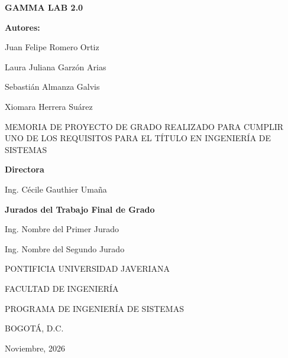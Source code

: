 \documentclass[12pt,letterpaper,oneside]{article}
\newcommand{\tituloProyecto}{GAMMA LAB 2.0}
\newcommand{\autorUno}{Juan Felipe Romero Ortiz}
\newcommand{\autorDos}{Laura Juliana Garzón Arias}
\newcommand{\autorTres}{Sebastián Almanza Galvis}
\newcommand{\autorCuatro}{Xiomara Herrera Suárez}
\newcommand{\leyendaGrado}{MEMORIA DE PROYECTO DE GRADO REALIZADO PARA CUMPLIR UNO DE
LOS REQUISITOS PARA EL TÍTULO EN INGENIERÍA DE SISTEMAS}
\newcommand{\director}{Ing. Cécile Gauthier Umaña}
\newcommand{\juradoUno}{Ing. Nombre del Primer Jurado}
\newcommand{\juradoDos}{Ing. Nombre del Segundo Jurado}
\newcommand{\universidad}{PONTIFICIA UNIVERSIDAD JAVERIANA}
\newcommand{\facultad}{FACULTAD DE INGENIERÍA}
\newcommand{\programa}{PROGRAMA DE INGENIERÍA DE SISTEMAS}
\newcommand{\ciudad}{BOGOTÁ, D.C.}
\newcommand{\fechaLarga}{Noviembre, 2026}      %
\begin{document}
\begin{center}
  {\Large\bfseries \tituloProyecto}\par
  \vspace{1.4cm}

  {\bfseries Autores:}\par
  \vspace{0.5cm}
  \autorUno\par
  \autorDos\par
  \autorTres\par
  \autorCuatro\par
  \vspace{1.4cm}

  \leyendaGrado\par
  \vspace{1.4cm}

  {\bfseries Directora}\par
  \vspace{0.4cm}
  \director\par
  \vspace{1.2cm}

  {\bfseries Jurados del Trabajo Final de Grado}\par
  \vspace{0.4cm}
  \juradoUno\par
  \juradoDos\par
  \vspace{1.8cm}

  \universidad\par\vspace{0.6cm}
  \facultad\par\vspace{0.6cm}
  \programa\par\vspace{0.6cm}
  \ciudad\par\vspace{0.6cm}
  \fechaLarga\par
\end{center}
\clearpage
\end{document}
